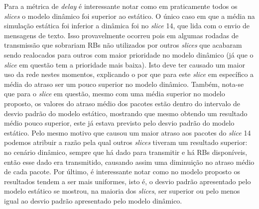 \documentclass[11pt,twoside]{article}
\begin{document}
	Para a métrica de \textit{delay} é interessante notar como em praticamente todos os \textit{slices} o modelo dinâmico foi superior ao estático. O único caso em que a média na simulação estática foi inferior a dinâmica foi no \textit{slice} 14, que lida com o envio de mensagens de texto. Isso provavelmente ocorreu pois em algumas rodadas de transmissão que sobrariam RBs não utilizados por outros \textit{slices} que acabaram sendo realocados para outros com maior prioridade no modelo dinâmico (já que o \textit{slice} em questão tem a prioridade mais baixa). Isto deve ter causado um maior uso da rede nestes momentos, explicando o por que para este \textit{slice} em específico a média do atraso ser um pouco superior no modelo dinâmico. Também, nota-se que para o \textit{slice} em questão, mesmo com uma média superior no modelo proposto, os valores do atraso médio dos pacotes estão dentro do intervalo de desvio padrão do modelo estático, mostrando que mesmo obtendo um resultado médio pouco superior, este já estava previsto pelo desvio padrão do modelo estático.  Pelo mesmo motivo que causou um maior atraso aos pacotes do \textit{slice} 14 podemos atribuir a razão pela qual outros \textit{slices} tiveram um resultado superior: no cenário dinâmico, sempre que há dado para transmitir e há RBs disponíveis, então esse dado era transmitido, causando assim uma diminuição no atraso médio de cada pacote. Por último, é interessante notar como no modelo proposto os resultados tendem a ser mais uniformes, isto é, o desvio padrão apresentado pelo modelo estático se mostrou, na maioria dos \textit{slices}, ser superior ou pelo menos igual ao desvio padrão apresentado pelo modelo dinâmico.
\end{document}
